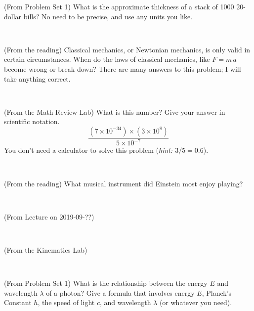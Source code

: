\documentclass[12pt, letterpaper]{article}
\begin{document}
\begin{problem} (From Problem Set 1)
What is the approximate thickness of a stack of 1000 20-dollar bills?
No need to be precise, and use any units you like.
\end{problem}


\vfill ~

\begin{problem} (From the reading)
Classical mechanics, or Newtonian mechanics, is only valid in certain
circumstances. When do the laws of classical mechanics, like $F =
m\,a$ become wrong or break down? There are many answers to this
problem; I will take anything correct.
\end{problem}


\vfill ~

\begin{problem} (From the Math Review Lab)
What is this number? Give your answer in scientific notation.
$$
\frac{(7\times10^{-34})\times(3\times10^8)}{5\times10^{-7}}
$$
You don't need a calculator to solve this problem (\textit{hint: $3/5=0.6$}).
\end{problem}


\vfill ~


\clearpage


\begin{problem} (From the reading)
What musical instrument did Einstein most enjoy playing?
\end{problem}


\vfill ~

\begin{problem} (From Lecture on 2019-09-??)
\end{problem}


\vfill ~

\begin{problem} (From the Kinematics Lab)

\end{problem}


\vfill ~

\begin{problem} (From Problem Set 1)
What is the relationship between the energy $E$ and wavelength
$\lambda$ of a photon? Give a formula that involves energy $E$,
Planck's Constant $h$, the speed of light $c$, and wavelength
$\lambda$ (or whatever you need).
\end{problem}

\vfill ~


\cleardoublepage
\end{document}
